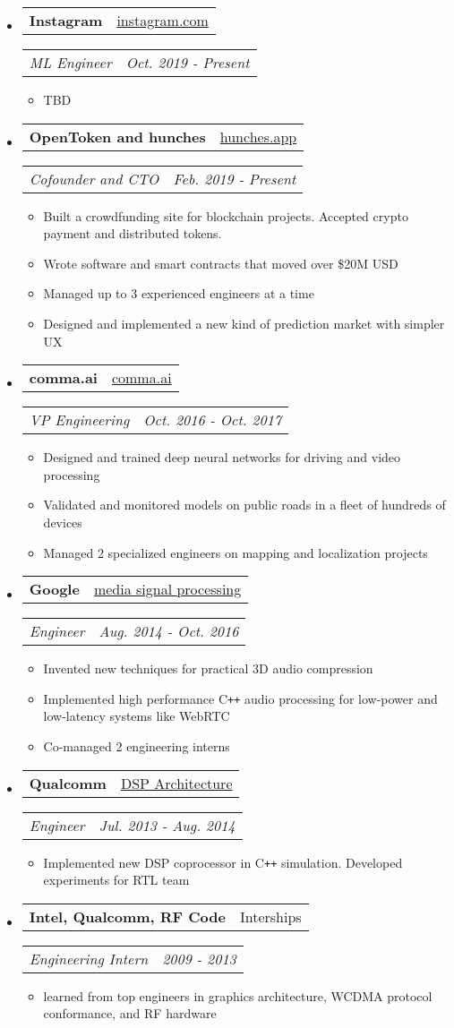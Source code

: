 \documentclass[hidelinks,letterpaper,10pt]{article}
\makeatletter
\newcommand{\resitem}[1]{\item #1 \vspace{-2pt}}
\newcommand{\resheading}[1]{{\large \parashade[.9]{sharpcorners}{\textbf{#1 \vphantom{p\^{E}}}}}
\vspace{-18pt}\noindent\makebox[\linewidth]{\rule{\textwidth}{1pt}}
}
\newcommand{\ressubheading}[4]{
\begin{tabular*}{6.5in}{l@{\extracolsep{\fill}}r}
        \textbf{#1} & #2
\end{tabular*}
\begin{tabular*}{6.5in}{l@{\extracolsep{\fill}}r}
        \textit{#3} & \textit{#4}
\end{tabular*}\vspace{-6pt}
}
\makeatother
\begin{document}
\resheading{Work}
\begin{itemize}
\item
	\ressubheading{Instagram}{\href{https://instagram.com}{instagram.com}}{ML Engineer}{Oct. 2019 - Present}
	\begin{itemize}
		\resitem{TBD}
	\end{itemize}

\item
	\ressubheading{OpenToken and hunches}{\href{https://hunches.app}{hunches.app}}{Cofounder and CTO}{Feb. 2019 - Present}
	\begin{itemize}
		\resitem{Built a crowdfunding site for blockchain projects. Accepted crypto payment and distributed tokens.}
		\resitem{Wrote software and smart contracts that moved over \$20M USD}
		\resitem{Managed up to 3 experienced engineers at a time}
		\resitem{Designed and implemented a new kind of prediction market with simpler UX}
	\end{itemize}

\item
	\ressubheading{comma.ai}{\href{https://comma.ai}{comma.ai}}{VP Engineering}{Oct. 2016 - Oct. 2017}
	\begin{itemize}
    \resitem{Designed and trained deep neural networks for driving and video processing}
		\resitem{Validated and monitored models on public roads in a fleet of hundreds of devices}
		\resitem{Managed 2 specialized engineers on mapping and localization projects}
	\end{itemize}

\item
	\ressubheading{Google}{\href{https://google.com}{media signal processing}}{Engineer}{Aug. 2014 - Oct. 2016}
	\begin{itemize}
		\resitem{Invented new techniques for practical 3D audio compression}
		\resitem{Implemented high performance C\texttt{++} audio processing for low-power and low-latency systems like WebRTC}
		\resitem{Co-managed 2 engineering interns}
	\end{itemize}

\item
	\ressubheading{Qualcomm}{\href{en.wikipedia.org/wiki/Qualcomm_Hexagon}{DSP Architecture}}{Engineer}{Jul. 2013 - Aug. 2014}
	\begin{itemize}
		\resitem{Implemented new DSP coprocessor in C\texttt{++} simulation. Developed experiments for RTL team}
	\end{itemize}

\item
	\ressubheading{Intel, Qualcomm, RF Code}{Interships}{Engineering Intern}{2009 - 2013}
	\begin{itemize}
		\resitem{learned from top engineers in graphics architecture, WCDMA protocol conformance, and RF hardware}
	\end{itemize}

\end{itemize}
\end{document}
